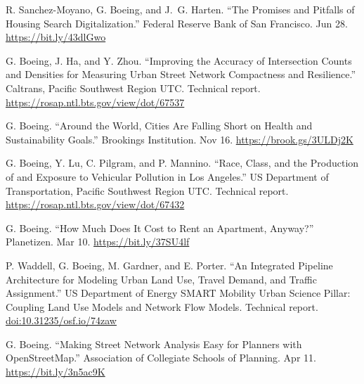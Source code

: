 \documentclass[11pt,letterpaper]{report} %
\begin{document}
\begin{tablist}

\item[2023] \tab{}R. Sanchez-Moyano, G. Boeing, and J.~G. Harten. \enquote{The Promises and Pitfalls of Housing Search Digitalization.} Federal Reserve Bank of San Francisco. Jun 28. \href{https://bit.ly/43dlGwo}{https://bit.ly/43dlGwo}

\item[2023] \tab{}G. Boeing, J. Ha, and Y. Zhou. \enquote{Improving the Accuracy of Intersection Counts and Densities for Measuring Urban Street Network Compactness and Resilience.} Caltrans, Pacific Southwest Region UTC\@. Technical report. \href{https://rosap.ntl.bts.gov/view/dot/67537}{https://rosap.ntl.bts.gov/view/dot/67537}

\item[2022] \tab{}G. Boeing. \enquote{Around the World, Cities Are Falling Short on Health and Sustainability Goals.} Brookings Institution. Nov 16. \href{https://brook.gs/3ULDj2K}{https://brook.gs/3ULDj2K}

\item[2021] \tab{}G. Boeing, Y. Lu, C. Pilgram, and P. Mannino. \enquote{Race, Class, and the Production of and Exposure to Vehicular Pollution in Los Angeles.} US Department of Transportation, Pacific Southwest Region UTC\@. Technical report. \href{https://rosap.ntl.bts.gov/view/dot/67432}{https://rosap.ntl.bts.gov/view/dot/67432}

\item[2020] \tab{}G. Boeing. \enquote{How Much Does It Cost to Rent an Apartment, Anyway?} Planetizen. Mar 10. \href{https://bit.ly/37SU4lf}{https://bit.ly/37SU4lf}

\item[2018] \tab{}P. Waddell, G. Boeing, M. Gardner, and E. Porter. \enquote{An Integrated Pipeline Architecture for Modeling Urban Land Use, Travel Demand, and Traffic Assignment.} US Department of Energy SMART Mobility Urban Science Pillar: Coupling Land Use Models and Network Flow Models. Technical report. \href{https://doi.org/10.31235/osf.io/74zaw}{doi:10.31235/osf.io/74zaw}

\item[2017] \tab{}G. Boeing. \enquote{Making Street Network Analysis Easy for Planners with OpenStreetMap.} Association of Collegiate Schools of Planning. Apr 11. \href{https://bit.ly/3n5ac9K}{https://bit.ly/3n5ac9K}

\end{tablist}
\end{document}
